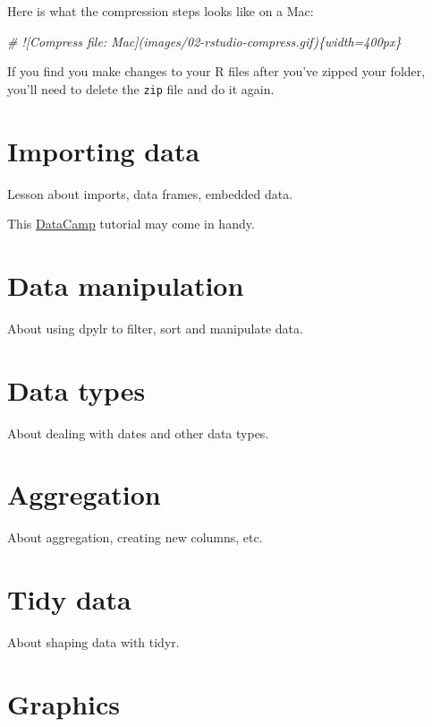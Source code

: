 \documentclass[]{book}
\newenvironment{Shaded}{\begin{snugshade}}{\end{snugshade}}
\newcommand{\CommentTok}[1]{\textcolor[rgb]{0.56,0.35,0.01}{\textit{#1}}}
\begin{document}
Here is what the compression steps looks like on a Mac:

\begin{Shaded}
\begin{Highlighting}[]
\CommentTok{# ![Compress file: Mac](images/02-rstudio-compress.gif)\{width=400px\}}
\end{Highlighting}
\end{Shaded}

If you find you make changes to your R files after you've zipped your
folder, you'll need to delete the \texttt{zip} file and do it again.

\chapter{Importing data}\label{import}

Lesson about imports, data frames, embedded data.

This
\href{https://www.datacamp.com/community/tutorials/r-data-import-tutorial\#spss}{DataCamp}
tutorial may come in handy.

\chapter{Data manipulation}\label{manipulation}

About using dpylr to filter, sort and manipulate data.

\chapter{Data types}\label{datatypes}

About dealing with dates and other data types.

\chapter{Aggregation}\label{aggregation}

About aggregation, creating new columns, etc.

\chapter{Tidy data}\label{tidy}

About shaping data with tidyr.

\chapter{Graphics}\label{graphics}
\end{document}
